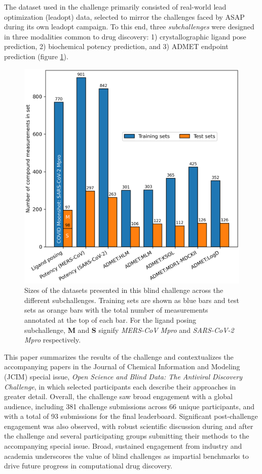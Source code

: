 \documentclass[journal=jcim,manuscript=article]{achemso}
\begin{document}
The dataset used in the challenge primarily consisted of real-world lead optimization (leadopt) data, selected to mirror the challenges faced by ASAP during its own leadopt campaign. To this end, three \textit{subchallenges} were designed in three modalities common to drug discovery: 1) crystallographic ligand pose prediction, 2) biochemical potency prediction, and 3) ADMET endpoint prediction (figure \ref{fgr:datasets_overview}).


\begin{figure}
    \includegraphics[scale=0.5]{01_figs_introduction/datasets_overview.png}
  \caption{Sizes of the datasets presented in this blind challenge across the different subchallenges. Training sets are shown as blue bars and test sets as orange bars with the total number of measurements annotated at the top of each bar. For the ligand posing subchallenge, \textbf{M} and \textbf{S} signify \textit{MERS-CoV Mpro} and \textit{SARS-CoV-2 Mpro} respectively. }
  \label{fgr:datasets_overview}
\end{figure}


This paper summarizes the results of the challenge and contextualizes the accompanying papers in the Journal of Chemical Information and Modeling (JCIM) special issue, \textit{Open Science and Blind Data: The Antiviral Discovery Challenge}, in which selected participants each describe their approaches in greater detail. Overall, the challenge saw broad engagement with a global audience, including 381 challenge submissions across 66 unique participants, and with a total of 93 submissions for the final leaderboard. Significant post-challenge engagement was also observed, with robust scientific discussion during and after the challenge and several participating groups submitting their methods to the accompanying special issue. Broad, sustained engagement from industry and academia underscores the value of blind challenges as impartial benchmarks to drive future progress in computational drug discovery. 
\end{document}
